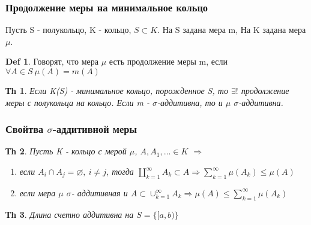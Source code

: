 \documentclass[14pt]{article}
\theoremstyle{plain}
\newtheorem{Thm}{Тh}
\theoremstyle{definition}
\newtheorem{Def}{Def}
\begin{document}
		\subsubsection*{Продолжение меры на минимальное кольцо}
		Пусть S - полукольцо, K - кольцо, $S \subset K$. На S задана мера m, На K задана мера $\mu$.
		\begin{Def}
			Говорят, что мера $\mu$ есть продолжение меры m, если $\forall A \in S \ \mu(A) = m(A)$
		\end{Def}
		\begin{Thm}
			Если K(S) - минимальное кольцо, порожденное S, то $\exists!$ продолжение меры с полукольца на кольцо. Если m - $\sigma$-аддитивна, то и $\mu$ $\sigma$-аддитивна.
		\end{Thm}
		\subsubsection*{Свойтва $\sigma$-аддитивной меры}
		\begin{Thm}
			Пусть K - кольцо с мерой $\mu$, $A, A_1, \dots \in K$ $\Rightarrow$ 
			\begin{enumerate}
				\item если $A_i \cap A_j = \varnothing, \ i \neq j$, тогда $\coprod\limits_{k=1}^{\infty} A_k \subset A \Rightarrow \sum\limits_{k=1}^{\infty} \mu(A_k) \leq \mu(A)$
				\item если мера $\mu$ $\sigma$- аддитивная и $A \subset \cup_{k=1}^{\infty} A_k \Rightarrow \mu(A) \leq \sum\limits_{k=1}^{\infty} \mu(A_k)$
			\end{enumerate}
		\end{Thm}
		\begin{Thm}
			Длина счетно аддитивна на $S  = \{[a, b)  \}$
		\end{Thm}
\end{document}
